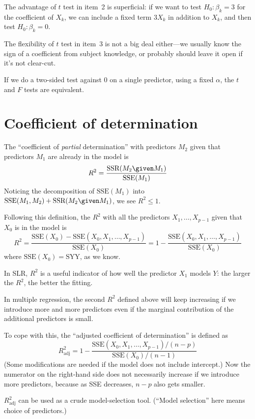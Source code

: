 \documentclass[12pt]{article}
\newcommand\SSE{\text{SSE}}
\newcommand\SSR{\text{SSR}}
\begin{document}
The advantage of $t$ test in item~2 is superficial: if we want to test
$H_0: \beta_k = 3$ for the coefficient of $X_k$,
we can include a fixed term $3X_k$ in addition to $X_k$,
and then test
$H_0: \beta_k = 0$.

The flexibility of $t$ test in item~3 is not a big deal either---we
usually know the sign of a coefficient from subject knowledge,
or probably should leave it open if it's not clear-cut.

If we do a two-sided test against 0 on a single predictor,
using a fixed $\alpha$,
the $t$ and $F$ tests are equivalent.


\section{Coefficient of determination}

The ``coefficient of \emph{partial} determination''
with predictors $M_2$ given that predictors $M_1$ are already in the
model is
\[
R^2 = \frac{\SSR(M_2 \given M_1)}{\SSE(M_1)}
\]
Noticing the decomposition of $\SSE(M_1)$
into $\SSE(M_1, M_2) + \SSR(M_2 \given M_1)$,
we see $R^2 \le 1$.

Following this definition,
the $R^2$ with all the predictors $X_1,\dotsc,X_{p-1}$
given that $X_0$ is in the model is
\[
R^2
= \frac{\text{SSE}(X_0) - \text{SSE}(X_0,X_1,\dotsc,X_{p-1})}
    {\text{SSE}(X_0)}
= 1 - \frac{\text{SSE}(X_0,X_1,\dotsc,X_{p-1})} {\text{SSE}(X_0)}
\]
where $\SSE(X_0) = \text{SYY}$, as we know.

In SLR,
$R^2$ is a useful indicator of how well the predictor $X_1$ models $Y$:
the larger the $R^2$, the better the fitting.

In multiple regression,
the second $R^2$ defined above
will keep increasing if we introduce more and more predictors
even if the marginal contribution of the additional predictors is small.

To cope with this,
the ``adjusted coefficient of determination'' is defined as
\[
R_{\text{adj}}^2
= 1 - \frac{\text{SSE}(X_0,X_1,\dotsc,X_{p-1}) / (n-p)}
    {\text{SSE}(X_0) / (n-1)}
\]
(Some modifications are needed if the model does not include intercept.)
Now
the numerator on the right-hand side does not necessarily
increase if we introduce more predictors,
because as SSE decreases, $n-p$ also gets smaller.

$R^2_{\text{adj}}$ can be used as a crude model-selection tool.
(``Model selection'' here means choice of predictors.)
\end{document}
